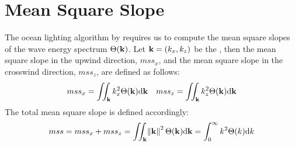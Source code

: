 \section{Mean Square Slope}
\label{app:mss}
%
The ocean lighting algorithm by \cite{misc:oceanlightingfft} requires us to compute
the mean square slopes of the wave energy spectrum $\Theta(\mathbf{k})$.
Let $\mathbf{k} = (k_x, k_z)$ be the \wavevector, then the mean square slope
in the upwind direction, $mss_x$, and the mean square slope in the crosswind
direction, $mss_z$, are defined as follows:
\begin{align}
mss_x = \iint_{\mathbf{k}} k_x^2 \Theta(\mathbf{k}) \mathrm{d}\mathbf{k} &&
mss_z = \iint_{\mathbf{k}} k_z^2 \Theta(\mathbf{k}) \mathrm{d}\mathbf{k}
\end{align}
%
The total mean square slope is defined accordingly:
\begin{equation}
mss = mss_x + mss_z = \iint_{\mathbf{k}} \norm{\mathbf{k}}^2 \Theta(\mathbf{k}) \mathrm{d}\mathbf{k} = \int_{0}^{\infty}k^2 \Theta(k)\mathrm{d}k
\end{equation}